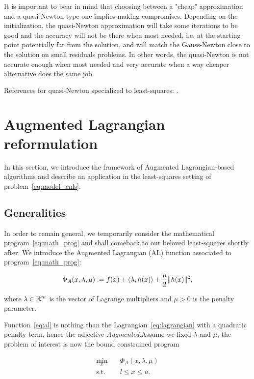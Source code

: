 \documentclass[10pt]{article}
\numberwithin{equation}{section}
\begin{document}
	 It is important to bear in mind that choosing between a "cheap" approximation and a quasi-Newton type one implies making compromises. Depending on the initialization, the quasi-Newton approximation will take some iterations to be good and the accuracy will not be there when most needed, i.e. at the starting point potentially far from the solution, and will match the Gauss-Newton close to the solution on small residuals problems. In other words, the quasi-Newton is not accurate enough when most needed and very accurate when a way cheaper alternative does the same job.
	 
	 References for quasi-Newton specialized to least-squares: \cite{dennisetal:1981,yabetakahashi}.
	 
	 \section{Augmented Lagrangian reformulation}\label{sec:about_al}
	 
	 In this section, we introduce the framework of Augmented Lagrangian-based algorithms and describe an application in the least-squares setting of problem~\eqref{eq:model_cnls}.
	 
	 \subsection{Generalities}
	 
	 In order to remain general, we temporarily consider the mathematical program~\eqref{eq:math_prog} and shall comeback to our beloved least-squares shortly after. 
	 We introduce the Augmented Lagrangian (AL) function associated to program~\eqref{eq:math_prog}:
	 
	 \begin{equation}
	 	\label{eq:al}
	 	\Phi_A(x,\lambda,\mu) := f(x) + \left\langle {\lambda} , {h(x)} \right\rangle + \dfrac{\mu}{2} \|h(x)\|^2,
	 \end{equation}
	 
	 where $\lambda\in {\mathbb{R}}^m$ is the vector of Lagrange multipliers and $\mu > 0$ is the penalty parameter.
	 
	 Function~\eqref{eq:al} is nothing than the Lagrangian~\eqref{eq:lagrangian} with a quadratic penalty term, hence the adjective \textit{Augmented}.Assume we fixed $\lambda$ and $\mu$, the problem of interest is now the bound constrained program
	 
	 \begin{equation}\label{eq:al_nlp}
	 	\begin{aligned}
	 		\min_x \quad & \Phi_A(x,\lambda,\mu) \\
	 		\text{s.t.} \quad & l \le x \le u.
	 	\end{aligned}
	 \end{equation}
	 
\end{document}
